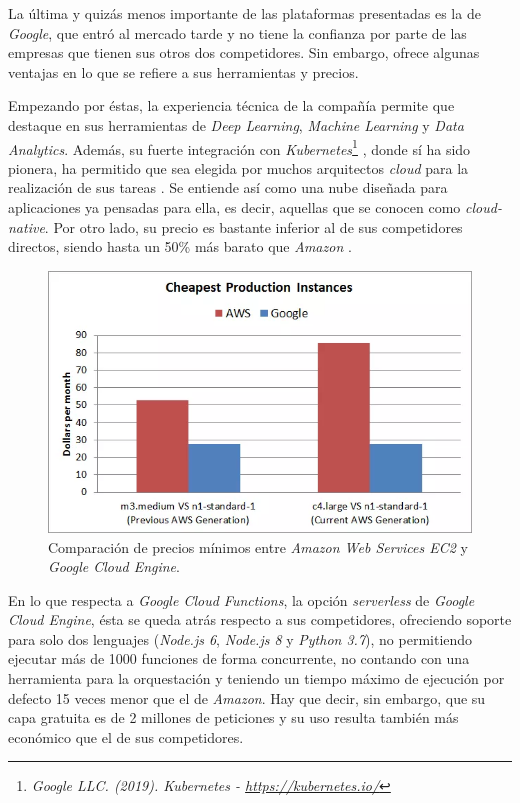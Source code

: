 \documentclass[11pt,spanish,listoffigures]{tfgetsinf}
\begin{document}
La última y quizás menos importante de las plataformas presentadas es la de \textit{Google}, que entró al mercado tarde y no tiene la confianza por parte de las empresas que tienen sus otros dos competidores. Sin embargo, ofrece algunas ventajas en lo que se refiere a sus herramientas y precios.

Empezando por éstas, la experiencia técnica de la compañía permite que destaque en sus herramientas de \textit{Deep Learning}, \textit{Machine Learning} y \textit{Data Analytics}. Además, su fuerte integración con \textit{Kubernetes}\footnote{\textit{Google LLC. (2019). \textit{Kubernetes} - \url{https://kubernetes.io/}}} \cite{kubernetes}, donde sí ha sido pionera, ha permitido que sea elegida por muchos arquitectos \textit{cloud} para la realización de sus tareas \cite{dev-ops-gcp}. Se entiende así como una nube diseñada para aplicaciones ya pensadas para ella, es decir, aquellas que se conocen como \textit{\gls{cloud-native}}. Por otro lado, su precio es bastante inferior al de sus competidores directos, siendo hasta un 50\% más barato que \textit{Amazon} \cite{gcp-cheaper-aws}.

\begin{figure}[h]
  \centering
  \includegraphics[width=1\textwidth]{images/img02.png}
  \caption{Comparación de precios mínimos entre \textit{Amazon Web Services EC2} y \textit{Google Cloud Engine}.}
\end{figure}

En lo que respecta a \textit{Google Cloud Functions}, la opción \textit{serverless} de \textit{Google Cloud Engine}, ésta se queda atrás respecto a sus competidores, ofreciendo soporte para solo dos lenguajes (\textit{Node.js 6}, \textit{Node.js 8} y \textit{Python 3.7}), no permitiendo ejecutar más de 1000 funciones de forma concurrente, no contando con una herramienta para la orquestación y teniendo un tiempo máximo de ejecución por defecto 15 veces menor que el de \textit{Amazon}. Hay que decir, sin embargo, que su capa gratuita es de 2 millones de peticiones y su uso resulta también más económico que el de sus competidores. 
\end{document}
